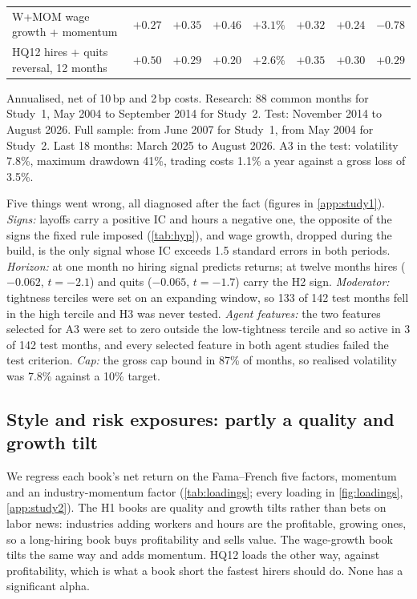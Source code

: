 \begin{table}[H]
\begin{threeparttable}
\begin{tabular}{@{}l r r r r r r r@{}}
W+MOM wage growth + momentum & $+0.27$ & $+0.35$ & $+0.46$ & $+3.1\%$ & $+0.32$ & $+0.24$ & $-0.78$ \\ %
HQ12 hires + quits reversal, 12 months & $+0.50$ & $+0.29$ & $+0.20$ & $+2.6\%$ & $+0.35$ & $+0.30$ & $+0.29$ \\ %
\bottomrule
\end{tabular}
\begin{tablenotes}\footnotesize
\item Annualised, net of 10\,bp and 2\,bp costs. Research: 88 common months for Study~1, May 2004 to September 2014 for Study~2. Test: November 2014 to August 2026. Full sample: from June 2007 for Study~1, from May 2004 for Study~2. Last 18 months: March 2025 to August 2026. A3 in the test: volatility 7.8\%, maximum drawdown 41\%, trading costs 1.1\% a year against a gross loss of 3.5\%. %
\end{tablenotes}
\end{threeparttable}
\end{table}

Five things went wrong, all diagnosed after the fact (figures in \cref{app:study1}). \emph{Signs:} layoffs carry a positive IC and hours a negative one, the opposite of the signs the fixed rule imposed (\cref{tab:hyp}), and wage growth, dropped during the build, is the only signal whose IC exceeds 1.5 standard errors in both periods. %
\emph{Horizon:} at one month no hiring signal predicts returns; at twelve months hires ($-0.062$, $t=-2.1$) and quits ($-0.065$, $t=-1.7$) carry the H2 sign. %
\emph{Moderator:} tightness terciles were set on an expanding window, so 133 of 142 test months fell in the high tercile and H3 was never tested. %
\emph{Agent features:} the two features selected for A3 were set to zero outside the low-tightness tercile and so active in 3 of 142 test months, and every selected feature in both agent studies failed the test criterion. %
\emph{Cap:} the gross cap bound in 87\% of months, so realised volatility was 7.8\% against a 10\% target. %

\subsection{Style and risk exposures: partly a quality and growth tilt}\label{sec:style}
We regress each book's net return on the Fama--French five factors, momentum and an industry-momentum factor (\cref{tab:loadings}; every loading in \cref{fig:loadings}, \cref{app:study2}). The H1 books are quality and growth tilts rather than bets on labor news: industries adding workers and hours are the profitable, growing ones, so a long-hiring book buys profitability and sells value. The wage-growth book tilts the same way and adds momentum. HQ12 loads the other way, against profitability, which is what a book short the fastest hirers should do. None has a significant alpha.

